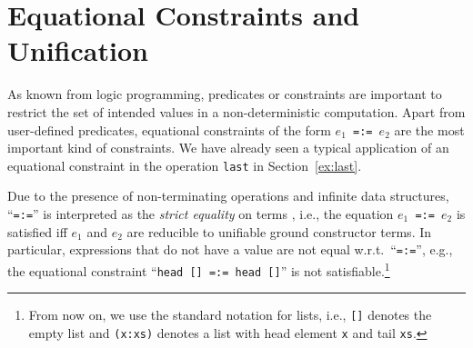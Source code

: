 \documentclass{llncs}
\newcommand{\code}[1]{\mbox{\small\texttt{#1}}}
\newcommand{\ccode}[1]{``\code{#1}''}
\begin{document}
\section{Equational Constraints and Unification}
\label{sec:Unification}

As known from logic programming, predicates or constraints
are important to restrict the set of intended values
in a non-deterministic computation.
Apart from user-defined predicates,
equational constraints of the form \code{$e_1$\,=:=\,$e_2$}
are the most important kind of constraints.
We have already seen a typical application
of an equational constraint in the operation
\code{last} in Section~\ref{ex:last}.

Due to the presence of non-terminating operations
and infinite data structures,
\ccode{=:=} is interpreted as the \emph{strict equality} on terms
\cite{GiovannettiLeviMoisoPalamidessi91},
i.e., the equation \code{$e_1$\,=:=\,$e_2$} is satisfied iff
$e_1$ and $e_2$ are reducible to unifiable ground constructor terms.
In particular, expressions that do not have a value
are not equal w.r.t.\ \ccode{=:=}, e.g.,
the equational constraint \ccode{head [] =:= head []}
is not satisfiable.\footnote{From now on, we use the
standard notation for lists, i.e., \code{[]} denotes the empty list
and \code{(x:xs)} denotes a list with head element \code{x}
and tail \code{xs}.}
\end{document}

